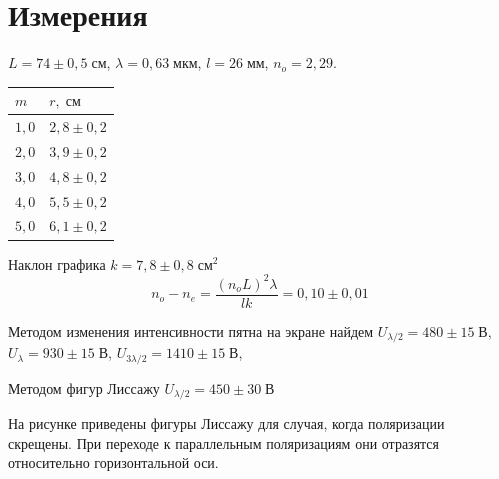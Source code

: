 \section{Измерения}

$L = 74 \pm 0{,}5\;\text{см}$, $\lambda = 0{,}63\;\text{мкм}$, $l = 26\;\text{мм}$, $n_{o} = 2{,}29$.

\begin{tabular}{|l|l|}
\hline
$m$ & $r,\;\text{см}$\\\hline
$1{,}0$ & $2{,}8 \pm 0{,}2$\\\hline
$2{,}0$ & $3{,}9 \pm 0{,}2$\\\hline
$3{,}0$ & $4{,}8 \pm 0{,}2$\\\hline
$4{,}0$ & $5{,}5 \pm 0{,}2$\\\hline
$5{,}0$ & $6{,}1 \pm 0{,}2$\\\hline
\end{tabular}

\begin{figure}[ht!]
\end{figure}

Наклон графика $k = 7{,}8 \pm 0{,}8\;\text{см}^{2}$
\[
    n_{o} - n_{e} = \frac{\left(n_{o} L\right) ^{ 2}\lambda}{lk} = 0{,}10\pm 0{,}01
\]

Методом изменения интенсивности пятна на экране найдем $U_{\lambda/2} = 480 \pm 15\;\text{В}$, $U_{\lambda} = 930\pm 15\;\text{В}$,  $U_{3\lambda/2} = 1410 \pm 15\;\text{В}$,

Методом фигур Лиссажу $U_{\lambda / 2} = 450 \pm 30\;\text{В}$

На рисунке приведены фигуры Лиссажу для случая, когда поляризации скрещены. При переходе к параллельным поляризациям они отразятся относительно горизонтальной оси.
\begin{figure}[ht!]
\end{figure}

